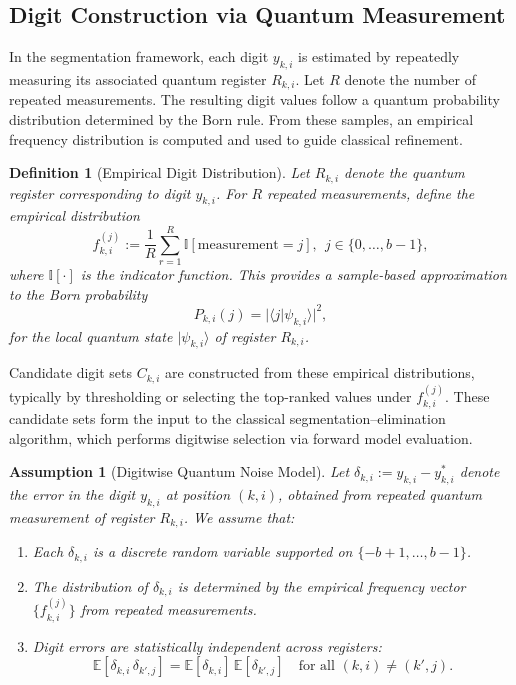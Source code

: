 \documentclass[aps,twocolumn,superscriptaddress,nofootinbib]{revtex4}
\newtheorem{definition}{Definition}
\newtheorem{assumption}{Assumption}
\begin{document}
\subsection{Digit Construction via Quantum Measurement}

In the segmentation framework, each digit $y_{k,i}$ is estimated by repeatedly measuring its associated quantum register $R_{k,i}$. Let $R$ denote the number of repeated measurements. The resulting digit values follow a quantum probability distribution determined by the Born rule. From these samples, an empirical frequency distribution is computed and used to guide classical refinement.

\begin{definition}[Empirical Digit Distribution]
Let $R_{k,i}$ denote the quantum register corresponding to digit $y_{k,i}$. For $R$ repeated measurements, define the empirical distribution
\begin{equation}
    f^{(j)}_{k,i} := \frac{1}{R} \sum_{r = 1}^{R} \mathbb{I}\left[ \text{measurement} = j \right], \ \  j \in \{0, \ldots, b - 1\},
\end{equation}
where $\mathbb{I}[\cdot]$ is the indicator function. This provides a sample-based approximation to the Born probability
\[
P_{k,i}(j) = |\langle j | \psi_{k,i} \rangle|^2,
\]
for the local quantum state $|\psi_{k,i}\rangle$ of register $R_{k,i}$.
\end{definition}

Candidate digit sets $C_{k,i}$ are constructed from these empirical distributions, typically by thresholding or selecting the top-ranked values under $f^{(j)}_{k,i}$. These candidate sets form the input to the classical segmentation--elimination algorithm, which performs digitwise selection via forward model evaluation.

\begin{assumption}[Digitwise Quantum Noise Model]
\label{assumption:digit_noise}
Let \( \delta_{k,i} := y_{k,i} - y^*_{k,i} \) denote the error in the digit \( y_{k,i} \) at position \( (k,i) \), obtained from repeated quantum measurement of register \( R_{k,i} \). We assume that:
\begin{enumerate}
    \item Each \( \delta_{k,i} \) is a discrete random variable supported on \( \{-b+1, \dots, b-1\} \).
    \item The distribution of \( \delta_{k,i} \) is determined by the empirical frequency vector \( \{ f^{(j)}_{k,i} \} \) from repeated measurements.
    \item Digit errors are statistically independent across registers:
    \[
    \mathbb{E}[\delta_{k,i} \, \delta_{k',j}] = \mathbb{E}[\delta_{k,i}] \, \mathbb{E}[\delta_{k',j}]
    \quad \text{for all } (k,i) \neq (k',j).
    \]
\end{enumerate}
\end{assumption}
\end{document}
